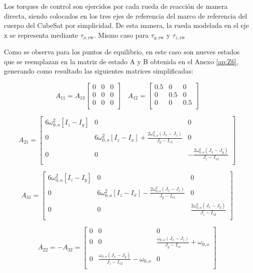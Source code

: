 Los torques de control son ejercidos por cada rueda de reacción de manera directa, siendo colocados en los tres ejes de referencia del marco de referencia del cuerpo del CubeSat por simplicidad. De esta manera, la rueda modelada en el eje x se representa mediante $\tau_{x, \text{rw}}$. Mismo caso para $\tau_{y, \text{rw}}$ y $\tau_{z, \text{rw}}$

Como se observa para los puntos de equilibrio, en este caso son nueves estados que se reemplazan en la matriz de estado A y B obtenida en el Anexo \ref{ap:Z6}, generando como resultado las siguientes matrices simplificadas:

\[
A_{11} = A_{13}
\begin{bmatrix}
	0 & 0 & 0 \\
	0 & 0 & 0 \\
	0 & 0 & 0 \\
\end{bmatrix} \quad
A_{12} = 
\begin{bmatrix}
	0.5 & 0 & 0 \\
	0 & 0.5 & 0 \\
	0 & 0 & 0.5 \\
\end{bmatrix}
\]

\[
A_{21} = 
\begin{bmatrix}
	 6 \omega_{0,o}^2 \left[I_z - I_y\right]  & 0 & 0 \\
	0 & 6 \omega_{0,o}^2 \left[I_z - I_x\right] + \frac{2 \omega_{0,o}^2 \left(J_x - J_z\right)}{J_y - I_{s1}}
	 & 0 \\
	0 & 0 &  -\frac{2 \omega_{0,o}^2 \left(J_x - J_y\right)}{J_z - I_{s2}}
	 \\
\end{bmatrix}
\]

\[
A_{31} = 
\begin{bmatrix}
	6 \omega_{0,o}^2 \left[I_z - I_y\right]  & 0 & 0 \\
	0 & 6 \omega_{0,o}^2 \left[I_z - I_x\right] - \frac{2 \omega_{0,o}^2 \left(J_x - J_z\right)}{J_y - I_{s1}}
	& 0 \\
	0 & 0 &  \frac{2 \omega_{0,o}^2 \left(J_x - J_y\right)}{J_z - I_{s2}}
	\\
\end{bmatrix}
\]

\[
A_{22} = -A_{32} = 
\begin{bmatrix}
	0  & 0 & 0 \\
	0  & 0 & \frac{\omega_{0,o} \left(J_x - J_z\right)}{J_y - I_{s1}} + \omega_{0,o} \\
	0 & \frac{\omega_{0,o} \left(J_x - J_y\right)}{J_z - I_{s2}} - \omega_{0,o} & 0	\\
\end{bmatrix}
\]


